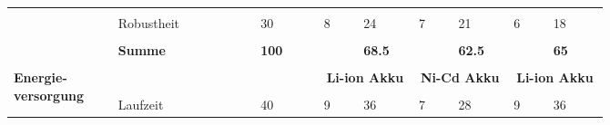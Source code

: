 \documentclass[main.tex]{subfiles} %
\begin{document}
\begin{landscape}
\begin{table}[H]
\begin{tabular}{|p{0.11\linewidth}|p{0.18\linewidth}|p{0.085\linewidth}|p{0.057\linewidth}|p{0.07\linewidth}|p{0.057\linewidth}|p{0.07\linewidth}|p{0.057\linewidth}|p{0.07\linewidth}|}
            \cline{2-9}
                                                           &                                     &                                            &                                             &                                             &   &               &   &             \\[-9pt]
                                                           & Robustheit                          & 30                                         & 8                                           & 24                                          & 7 & 21            & 6 & 18          \\[1pt]
            \cline{2-9}
                                                           &                                     &                                            &                                             &                                             &   &               &   &             \\[-9pt]
                                                           & \textbf{Summe}                      & \textbf{100}                               &                                             & \textbf{68.5}                               &   & \textbf{62.5} &   & \textbf{65} \\[1pt]
            \hline
            \hline
                                                           & \multicolumn{2}{c|}{}               & \multicolumn{2}{c|}{}                      & \multicolumn{2}{c|}{}                       & \multicolumn{2}{c|}{}                                                             \\[-9pt]
            \multirow{4}{4em}{\textbf{Energie-versorgung}} & \multicolumn{2}{c|}{}               & \multicolumn{2}{c|}{\textbf{Li-ion Akku}}  & \multicolumn{2}{c|}{\textbf{Ni-Cd Akku}}    & \multicolumn{2}{c|}{\textbf{Li-ion Akku}}                                         \\[1pt]
            \cline{2-9}
                                                           &                                     &                                            &                                             &                                             &   &               &   &             \\[-9pt]
                                                           & Laufzeit                            & 40                                         & 9                                           & 36                                          & 7 & 28            & 9 & 36          \\[1pt]

\end{tabular}
\end{table}
\end{landscape}
\end{document}
